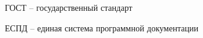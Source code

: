 \newpage
\begin{abbreviations}

ГОСТ -- государственный стандарт

ЕСПД -- единая система программной документации

\end{abbreviations}